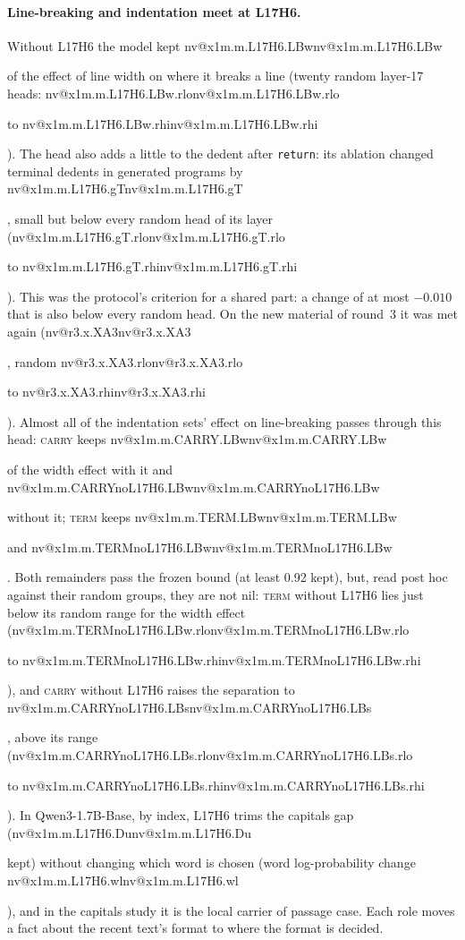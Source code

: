 \documentclass[11pt]{article}
\makeatletter
\newcommand{\nv}[1]{\ifcsname nv@#1\endcsname\csname nv@#1\endcsname\else\PackageError{numbers}{Unknown number key #1}{}\fi}
\newcommand{\hd}[2]{L#1H#2}
\newcommand{\code}[1]{\texttt{#1}}
\newcommand{\term}{\textsc{term}}
\newcommand{\carry}{\textsc{carry}}
\newcommand{\qbig}{Qwen3-1.7B-Base}
\newcommand{\xm}[2]{\nv{x1m.m.#1.#2}}
\newcommand{\xr}[2]{\nv{x1m.m.#1.#2.rlo} to \nv{x1m.m.#1.#2.rhi}}
\makeatother
\begin{document}
\begin{table}[t]
\centering\small
\caption{Shared parts: each named group ablated at the decision positions of every task, held out. Line-breaking: width effect and break/non-break separation kept. Indentation: change in mean log-probability of the right indent at unmarked dedents in natural code and terminal dedents in generated programs. Ordinals: teen effect and last-digit pull kept at four digits. Capitals (\qbig{}, heads by index): $D_{\text{up}}$ and $D_{\text{low}}$ kept, the upper- and lower-case log-probability gaps. COUNT, WRITE and READ are the line-breaking counters, newline writers and readers (members in the text); ``--'': not run. Post hoc marks compare each value with the range of its twenty random groups, given in \cref{app:x1}: $\dagger$ below the range (more harm than any random group), $\ddagger$ above it.}
\label{tab:x1}
\setlength{\tabcolsep}{4pt}

\end{table}

\paragraph{Line-breaking and indentation meet at \hd{17}{6}.} Without \hd{17}{6} the model kept \xm{L17H6}{LBw} of the effect of line width on where it breaks a line (twenty random layer-17 heads: \xr{L17H6}{LBw}). The head also adds a little to the dedent after \code{return}: its ablation changed terminal dedents in generated programs by \xm{L17H6}{gT}, small but below every random head of its layer (\xr{L17H6}{gT}). This was the protocol's criterion for a shared part: a change of at most $-0.010$ that is also below every random head. On the new material of round~3 it was met again (\nv{r3.x.XA3}, random \nv{r3.x.XA3.rlo} to \nv{r3.x.XA3.rhi}). Almost all of the indentation sets' effect on line-breaking passes through this head: \carry{} keeps \xm{CARRY}{LBw} of the width effect with it and \xm{CARRYnoL17H6}{LBw} without it; \term{} keeps \xm{TERM}{LBw} and \xm{TERMnoL17H6}{LBw}. Both remainders pass the frozen bound (at least 0.92 kept), but, read post hoc against their random groups, they are not nil: \term{} without \hd{17}{6} lies just below its random range for the width effect (\xr{TERMnoL17H6}{LBw}), and \carry{} without \hd{17}{6} raises the separation to \xm{CARRYnoL17H6}{LBs}, above its range (\xr{CARRYnoL17H6}{LBs}). In \qbig{}, by index, \hd{17}{6} trims the capitals gap (\xm{L17H6}{Du} kept) without changing which word is chosen (word log-probability change \xm{L17H6}{wl}), and in the capitals study it is the local carrier of passage case. Each role moves a fact about the recent text's format to where the format is decided.
\end{document}
